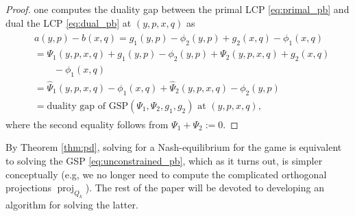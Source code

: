 \documentclass[a4paper,9pt]{extarticle}
\DeclareMathOperator{\proj}{proj}
\begin{document}
\begin{proof}
one computes the duality gap between the primal LCP
\eqref{eq:primal_pb} and dual the LCP \eqref{eq:dual_pb} at $(y, p, x, q)$ as
\begin{eqnarray*}
  \begin{split}
    &a(y, p) - b(x, q) = g_1(y, p) - \phi_2(y, p) + g_2(x, q) - \phi_1(x,
  q) \\
  &= \Psi_1(y, p, x, q) +  g_1(y, p) - \phi_2(y, p) + \Psi_2(y, p, x,
  q) + g_2(x, q) \\
  &\hspace{2em}- \phi_1(x, q)\\
  &= \hat{\Psi}_1(y, p, x, q) - \phi_1(x,
  q) + \hat{\Psi}_2(y, p, x, q) - \phi_2(y, p)\\
  &= \text{duality gap of GSP}(\Psi_1, \Psi_2,
  g_1, g_2) \text{ at }(y, p, x, q),
  \end{split}
\end{eqnarray*}
where the second equality follows from %
$\Psi_1 + \Psi_2 := 0$.
\end{proof}


By Theorem \ref{thm:pd}, solving for a Nash-equilibrium for
the game is equivalent to solving the GSP
\eqref{eq:unconstrained_pb}, which as it turns out, is simpler
conceptually (e.g, we no longer need to compute the
complicated orthogonal projections $\proj_{Q_k}$). The rest of the
paper will be devoted to developing an algorithm for solving the latter.


\end{document}

